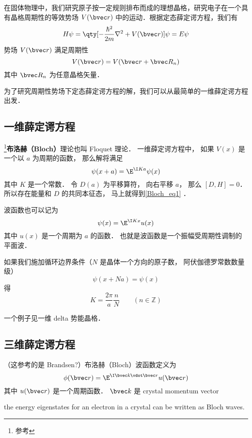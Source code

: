
\begin{issues}
\issueDraft
\end{issues}


在固体物理中，我们研究原子按一定规则排布而成的理想晶格，研究电子在一个具有晶格周期性的等效势场 $V(\bvec r)$ 中的运动．根据定态薛定谔方程，我们有
\begin{equation}
H\psi=\qty[-\frac{\hbar^2}{2m}\nabla^2+V(\bvec r)] \psi = E\psi
\end{equation}
势场 $V(\bvec r)$ 满足周期性
\begin{equation}
V(\bvec r)=V(\bvec r+\bvec R_n)
\end{equation}
其中 $\bvec R_n$ 为任意晶格矢量．

为了研究周期性势场下定态薛定谔方程的解，我们可以从最简单的一维薛定谔方程出发．

\subsection{一维薛定谔方程}
\footnote{参考\cite{GriffQ}}\textbf{布洛赫（Bloch）}理论也叫 Floquet 理论． 一维薛定谔方程中， 如果 $V(x)$ 是一个以 $a$ 为周期的函数， 那么解将满足
\begin{equation}\label{Bloch_eq1}
\psi(x+a) = \E^{\I K a}\psi(x)
\end{equation}
其中 $K$ 是一个常数． 令 $D(a)$ 为平移算符， 向右平移 $a$， 那么 $[D,H] = 0$． 所以存在能量和 $D$ 的共同本征态， 马上就得到\autoref{Bloch_eq1} ．

波函数也可以记为
\begin{equation}
\psi(x) = \E^{\I K x} u(x)
\end{equation}
其中 $u(x)$ 是一个周期为 $a$ 的函数． 也就是波函数是一个振幅受周期性调制的平面波．

如果我们施加循环边界条件（$N$ 是晶体一个方向的原子数， 阿伏伽德罗常数数量级）
\begin{equation}
\psi(x+Na) = \psi(x)
\end{equation}
得
\begin{equation}
K = \frac{2\pi}{a} \frac{n}{N} \qquad (n \in \mathbb Z)
\end{equation}

一个例子见一维 delta 势能晶格．

\subsection{三维薛定谔方程}

（这参考的是 Brandsen?）布洛赫（Bloch）波函数定义为
\begin{equation}
\phi(\bvec r) = \E^{\I \bvec k \vdot \bvec r} u(\bvec r)
\end{equation}
其中 $u(\bvec r)$ 是一个周期函数． $\bvec k$ 是 crystal momentum vector

the energy eigenstates for an electron in a crystal can be written as Bloch waves.
